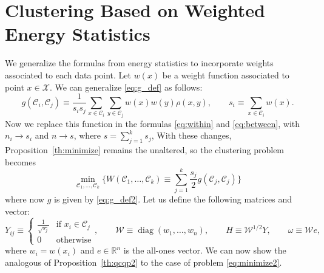 \documentclass[aps,preprint,nofootinbib,floatfix]{revtex4-1}
\DeclareMathOperator{\diag}{diag}
\newcommand\C{{\mathcal{C}}}
\newcommand\e{e}
\newcommand\om{\omega}
\begin{document}
\section{Clustering Based on Weighted Energy Statistics}
\label{sec:weighted}

We generalize the formulas from energy statistics to incorporate
weights associated to each data point.
Let $w(x)$ be a weight function associated to point $x \in \mathcal{X}$.
We can generalize \eqref{eq:g_def} as follows:
\begin{equation}
\label{eq:g_def2}
g(\C_i, \C_j) \equiv \dfrac{1}{s_i s_j} \sum_{x\in \C_i}\sum_{y\in\C_j}
w(x)w(y) \rho(x,y), \qquad s_i \equiv \sum_{x\in\C_i} w(x).
\end{equation}
Now we replace this function in the formulas \eqref{eq:within} and
\eqref{eq:between}, with 
$n_i \to s_i$ and $n \to s$, where $s = \sum_{j=1}^k s_j$,
With these
changes, Proposition~\ref{th:minimize} remains the unaltered, so the
clustering problem becomes
\begin{equation}
\label{eq:minimize2}
\min_{\C_1, \dotsc, \C_k} 
\bigg\{
W(\C_1,\dotsc,\C_k) \equiv \sum_{j=1}^k \dfrac{s_j}{2} g(\C_j,\C_j)
\bigg\}
\end{equation}
where now $g$ is given by \eqref{eq:g_def2}. 
Let us define the following matrices and vector:
\begin{equation}
\label{eq:weighted_matrices}
Y_{ij} \equiv \begin{cases}
\tfrac{1}{\sqrt{s_j}} & \mbox{if $x_i \in \C_j$} \\
0 & \mbox{otherwise}
\end{cases}, \qquad
\mathcal{W} \equiv \diag(w_1,\dotsc,w_n), \qquad
H \equiv \mathcal{W}^{1/2} Y, \qquad
\om \equiv \mathcal{W} \e,
\end{equation}
where $w_i = w(x_i)$ and $\e \in \mathbb{R}^n$ is the all-ones
vector. We can now show the analogous of
Proposition~\ref{th:qcqp2} to the case of problem \eqref{eq:minimize2}.
\end{document}
